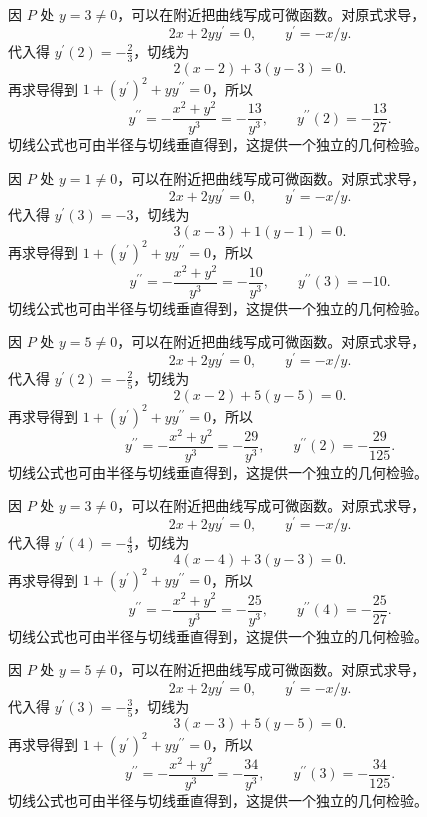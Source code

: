 \documentclass[12pt,fontset=fandol]{ctexart}
\begin{document}
\begin{solve}\label{ans:c9q2}
因 $P$ 处 $y=3\ne0$，可以在附近把曲线写成可微函数。对原式求导，
\[
2x+2yy^{{\prime}}=0,\qquad y^{{\prime}}=-x/y.
\]
代入得 $y^{\prime}(2)=-\frac{2}{3}$，切线为
\[
2(x-2)+3(y-3)=0.
\]
再求导得到 $1+(y^{\prime})^2+yy^{\prime\prime}=0$，所以
\[
y^{\prime\prime}=-\frac{x^2+y^2}{y^3}=-\frac{13}{y^3},\qquad y^{\prime\prime}(2)=-\frac{13}{27}.
\]
切线公式也可由半径与切线垂直得到，这提供一个独立的几何检验。
\end{solve}

\begin{solve}\label{ans:c9q3}
因 $P$ 处 $y=1\ne0$，可以在附近把曲线写成可微函数。对原式求导，
\[
2x+2yy^{{\prime}}=0,\qquad y^{{\prime}}=-x/y.
\]
代入得 $y^{\prime}(3)=-3$，切线为
\[
3(x-3)+1(y-1)=0.
\]
再求导得到 $1+(y^{\prime})^2+yy^{\prime\prime}=0$，所以
\[
y^{\prime\prime}=-\frac{x^2+y^2}{y^3}=-\frac{10}{y^3},\qquad y^{\prime\prime}(3)=-10.
\]
切线公式也可由半径与切线垂直得到，这提供一个独立的几何检验。
\end{solve}

\begin{solve}\label{ans:c9q4}
因 $P$ 处 $y=5\ne0$，可以在附近把曲线写成可微函数。对原式求导，
\[
2x+2yy^{{\prime}}=0,\qquad y^{{\prime}}=-x/y.
\]
代入得 $y^{\prime}(2)=-\frac{2}{5}$，切线为
\[
2(x-2)+5(y-5)=0.
\]
再求导得到 $1+(y^{\prime})^2+yy^{\prime\prime}=0$，所以
\[
y^{\prime\prime}=-\frac{x^2+y^2}{y^3}=-\frac{29}{y^3},\qquad y^{\prime\prime}(2)=-\frac{29}{125}.
\]
切线公式也可由半径与切线垂直得到，这提供一个独立的几何检验。
\end{solve}

\begin{solve}\label{ans:c9q5}
因 $P$ 处 $y=3\ne0$，可以在附近把曲线写成可微函数。对原式求导，
\[
2x+2yy^{{\prime}}=0,\qquad y^{{\prime}}=-x/y.
\]
代入得 $y^{\prime}(4)=-\frac{4}{3}$，切线为
\[
4(x-4)+3(y-3)=0.
\]
再求导得到 $1+(y^{\prime})^2+yy^{\prime\prime}=0$，所以
\[
y^{\prime\prime}=-\frac{x^2+y^2}{y^3}=-\frac{25}{y^3},\qquad y^{\prime\prime}(4)=-\frac{25}{27}.
\]
切线公式也可由半径与切线垂直得到，这提供一个独立的几何检验。
\end{solve}

\begin{solve}\label{ans:c9q6}
因 $P$ 处 $y=5\ne0$，可以在附近把曲线写成可微函数。对原式求导，
\[
2x+2yy^{{\prime}}=0,\qquad y^{{\prime}}=-x/y.
\]
代入得 $y^{\prime}(3)=-\frac{3}{5}$，切线为
\[
3(x-3)+5(y-5)=0.
\]
再求导得到 $1+(y^{\prime})^2+yy^{\prime\prime}=0$，所以
\[
y^{\prime\prime}=-\frac{x^2+y^2}{y^3}=-\frac{34}{y^3},\qquad y^{\prime\prime}(3)=-\frac{34}{125}.
\]
切线公式也可由半径与切线垂直得到，这提供一个独立的几何检验。
\end{solve}
\end{document}
